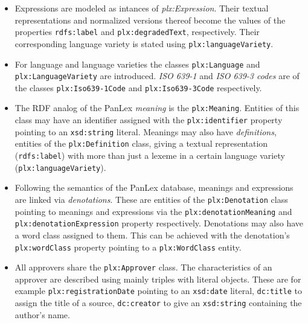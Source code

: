 \documentclass[sw]{iosart2c}
\newcommand{\vocab}[1]{\emph{#1}}
\begin{document}
\begin{itemize}
\item Expressions are modeled as intances of \vocab{plx:Expression}.
Their textual representations and normalized versions thereof become the 
values of the properties \texttt{\small rdfs:label} and \texttt{\small plx:degradedText}, respectively.
Their corresponding language variety is stated
using \texttt{\small plx:languageVariety}.

\item For language and language varieties the classes
\texttt{\small plx:Language} and \texttt{\small plx:LanguageVariety} are introduced.
\emph{ISO 639-1} and \emph{ISO 639-3 codes} are of the classes
\texttt{\small plx:Iso639-1Code} and \texttt{\small plx:Iso639-3Code} respectively.

\item The RDF analog of the PanLex \emph{meaning} is the \texttt{\small plx:Meaning}.
Entities of this class may have an identifier assigned with the
\texttt{\small plx:identifier} property pointing to an \texttt{\small xsd:string} literal.
Meanings may also have \emph{definitions}, entities of the
\texttt{\small plx:Definition} class, giving a textual representation
(\texttt{\small rdfs:label}) with more than just a lexeme in a certain
language variety (\texttt{\small plx:languageVariety}).

\item Following the semantics of the PanLex database, meanings and expressions are linked via \emph{denotations}.
These are entities of the \texttt{\small plx:Denotation} class pointing to meanings and expressions via the \texttt{\small plx:denotationMeaning} and \texttt{\small plx:denotationExpression} property respectively.
Denotations may also have a word class assigned to them.
This can be achieved with the denotation's \texttt{\small plx:wordClass} property pointing to a \texttt{\small plx:WordClass} entity.
\item All approvers share the \texttt{\small plx:Approver} class. The characteristics of an approver are described using mainly triples with literal objects.
These are for example \texttt{\small plx:registrationDate} pointing to an \texttt{\small xsd:date} literal,
\texttt{\small dc:title} to assign the title of a source,
\texttt{\small dc:creator} to give an \texttt{\small xsd:string} containing the author's name.
\end{itemize}
\end{document}
